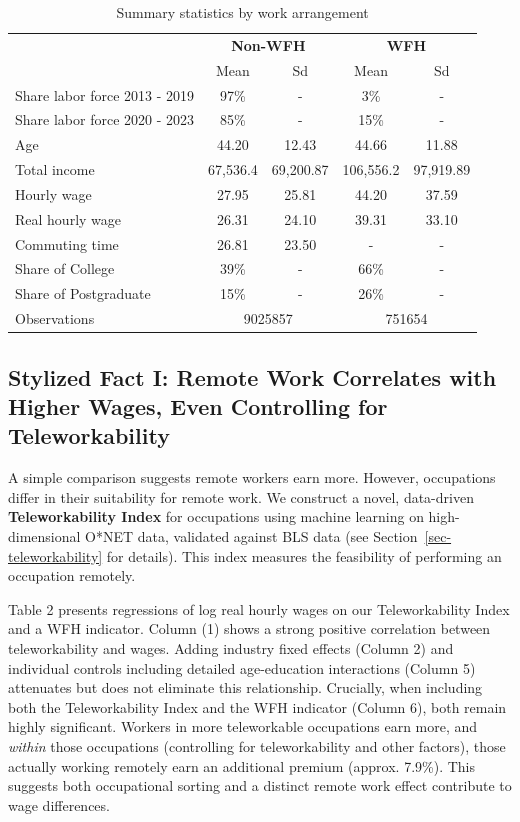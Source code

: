 \documentclass[
  11pt,
  letterpaper,
  DIV=11,
  numbers=noendperiod]{scrartcl}
\theoremstyle{plain}
\theoremstyle{remark}
\begin{document}
\begin{table}[htpb]
\centering
\caption{Summary statistics by work arrangement}
\begin{tabular}{lcccc}
\hline
\hline
& \multicolumn{2}{c}{\textbf{Non-WFH}} & \multicolumn{2}{c}{\textbf{WFH}}\\
\cline{2-3}\cline{4-5}
& Mean & Sd & Mean & Sd \\
\hline
Share labor force 2013 - 2019 & 97\% & - & 3\% & - \\
Share labor force 2020 - 2023 & 85\% & - & 15\% & - \\
Age & 44.20 & 12.43 & 44.66& 11.88 \\
Total income & 67,536.4 & 69,200.87 & 106,556.2 & 97,919.89 \\
Hourly wage & 27.95 & 25.81 & 44.20 & 37.59 \\
Real hourly wage & 26.31 & 24.10 & 39.31 & 33.10\\
Commuting time & 26.81 & 23.50 & - & - \\
Share of College & 39\% & - & 66\% & - \\
Share of Postgraduate & 15\% & - & 26\% & - \\
\hline
\hline
Observations & \multicolumn{2}{c}{9025857} & \multicolumn{2}{c}{751654}\\
\hline
\hline
\end{tabular}
\end{table}

\subsection{Stylized Fact I: Remote Work Correlates with Higher Wages,
Even Controlling for
Teleworkability}\label{stylized-fact-i-remote-work-correlates-with-higher-wages-even-controlling-for-teleworkability}

A simple comparison suggests remote workers earn more. However,
occupations differ in their suitability for remote work. We construct a
novel, data-driven \textbf{Teleworkability Index} for occupations using
machine learning on high-dimensional O*NET data, validated against BLS
data (see Section~\ref{sec-teleworkability} for details). This index
measures the feasibility of performing an occupation remotely.

Table 2 presents regressions of log real hourly wages on our
Teleworkability Index and a WFH indicator. Column (1) shows a strong
positive correlation between teleworkability and wages. Adding industry
fixed effects (Column 2) and individual controls including detailed
age-education interactions (Column 5) attenuates but does not eliminate
this relationship. Crucially, when including both the Teleworkability
Index and the WFH indicator (Column 6), both remain highly significant.
Workers in more teleworkable occupations earn more, and \emph{within}
those occupations (controlling for teleworkability and other factors),
those actually working remotely earn an additional premium (approx.
7.9\%). This suggests both occupational sorting and a distinct remote
work effect contribute to wage differences.
\end{document}
